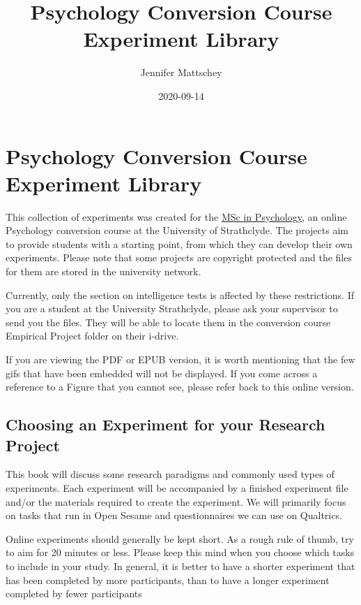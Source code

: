 \documentclass[
]{book}
\title{Psychology Conversion Course Experiment Library}
\author{Jennifer Mattschey}
\date{2020-09-14}
\begin{document}
\maketitle

{
\setcounter{tocdepth}{1}
\tableofcontents
}
\hypertarget{psychology-conversion-course-experiment-library}{%
\chapter{Psychology Conversion Course Experiment Library}\label{psychology-conversion-course-experiment-library}}

This collection of experiments was created for the \href{https://www.strath.ac.uk/courses/postgraduatetaught/psychologywithaspecialisationinbusiness}{MSc in Psychology}, an online Psychology conversion course at the University of Strathclyde. The projects aim to provide students with a starting point, from which they can develop their own experiments. Please note that some projects are copyright protected and the files for them are stored in the university network.

Currently, only the section on intelligence tests is affected by these restrictions. If you are a student at the University Strathclyde, please ask your supervisor to send you the files. They will be able to locate them in the conversion course Empirical Project folder on their i-drive.

If you are viewing the PDF or EPUB version, it is worth mentioning that the few gifs that have been embedded will not be displayed. If you come across a reference to a Figure that you cannot see, please refer back to this online version.

\hypertarget{choosing-an-experiment-for-your-research-project}{%
\section{Choosing an Experiment for your Research Project}\label{choosing-an-experiment-for-your-research-project}}

This book will discuss some research paradigms and commonly used types of experiments. Each experiment will be accompanied by a finished experiment file and/or the materials required to create the experiment. We will primarily focus on tasks that run in Open Sesame and questionnaires we can use on Qualtrics.

Online experiments should generally be kept short. As a rough rule of thumb, try to aim for 20 minutes or less. Please keep this mind when you choose which tasks to include in your study. In general, it is better to have a shorter experiment that has been completed by more participants, than to have a longer experiment completed by fewer participants
\end{document}
